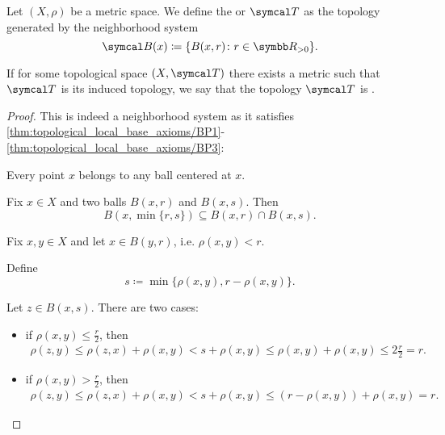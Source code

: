 \begin{definition}\label{def:metric_topology}\cite[249]{Engelking1989}
  Let \( (X, \rho) \) be a metric space. We define the  or  \( \Cal{T} \) as the topology generated by the neighborhood system
  \begin{equation*}
    \Cal{B}(x) \coloneqq \{ B(x, r) \colon r \in \BR_{>0} \}.
  \end{equation*}

  If for some topological space \( (X, \Cal{T}) \) there exists a metric such that \( \Cal{T} \) is its induced topology, we say that the topology \( \Cal{T} \) is .
\end{definition}
\begin{proof}
  This is indeed a neighborhood system as it satisfies \ref{thm:topological_local_base_axioms/BP1}-\ref{thm:topological_local_base_axioms/BP3}:

  \begin{description}
     Every point \( x \) belongs to any ball centered at \( x \).

     Fix \( x \in X \) and two balls \( B(x, r) \) and \( B(x, s) \). Then
    \begin{equation*}
      B(x, \min\{ r, s \}) \subseteq B(x, r) \cap B(x, s).
    \end{equation*}

     Fix \( x, y \in X \) and let \( x \in B(y, r) \), i.e. \( \rho(x, y) < r \).

    Define
    \begin{equation*}
      s \coloneqq \min\{ \rho(x, y), r - \rho(x, y) \}.
    \end{equation*}

    Let \( z \in B(x, s) \). There are two cases:
    \begin{itemize}
      \item if \( \rho(x, y) \leq \tfrac r 2 \), then
      \begin{align*}
        \rho(z, y)
        \leq
        \rho(z, x) + \rho(x, y)
        <
        s + \rho(x, y)
        \leq
        \rho(x, y) + \rho(x, y)
        \leq
        2 \tfrac r 2
        =
        r.
      \end{align*}

      \item if \( \rho(x, y) > \tfrac r 2 \), then
      \begin{align*}
        \rho(z, y)
        \leq
        \rho(z, x) + \rho(x, y)
        <
        s + \rho(x, y)
        \leq
        (r - \rho(x, y)) + \rho(x, y)
        =
        r.
      \end{align*}
    \end{itemize}


\end{description}
\end{proof}

